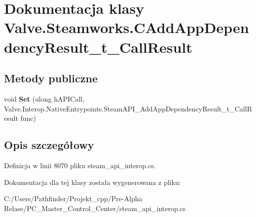 \hypertarget{class_valve_1_1_steamworks_1_1_c_add_app_dependency_result__t___call_result}{}\section{Dokumentacja klasy Valve.\+Steamworks.\+C\+Add\+App\+Dependency\+Result\+\_\+t\+\_\+\+Call\+Result}
\label{class_valve_1_1_steamworks_1_1_c_add_app_dependency_result__t___call_result}
\subsection*{Metody publiczne}
\begin{DoxyCompactItemize}
\item 
\mbox{\label{class_valve_1_1_steamworks_1_1_c_add_app_dependency_result__t___call_result_af53463a6afe1259062ba6ece046b669e}} 
void {\bfseries Set} (ulong h\+A\+P\+I\+Call, Valve.\+Interop.\+Native\+Entrypoints.\+Steam\+A\+P\+I\+\_\+\+Add\+App\+Dependency\+Result\+\_\+t\+\_\+\+Call\+Result func)
\end{DoxyCompactItemize}


\subsection{Opis szczegółowy}


Definicja w linii 8070 pliku steam\+\_\+api\+\_\+interop.\+cs.



Dokumentacja dla tej klasy została wygenerowana z pliku\+:\begin{DoxyCompactItemize}
\item 
C\+:/\+Users/\+Pathfinder/\+Projekt\+\_\+cpp/\+Pre-\/\+Alpha Relase/\+P\+C\+\_\+\+Master\+\_\+\+Control\+\_\+\+Center/steam\+\_\+api\+\_\+interop.\+cs\end{DoxyCompactItemize}
